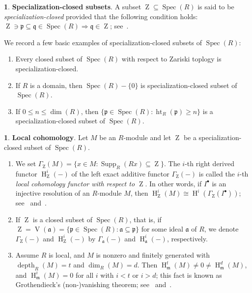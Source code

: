 \documentclass[11pt]{amsart}
\theoremstyle{definition}
\theoremstyle{definition}
\newtheorem{chunk}[thm]{\hspace*{-1.065ex}\bf}
\numberwithin{equation}{section}
\newcommand{\fm}{\mathfrak{m}}
\newcommand{\fp}{\mathfrak{p}}
\newcommand{\fq}{\mathfrak{q}}
\newcommand{\fa}{\mathfrak{a}}
\DeclareMathOperator{\V}{V}
\DeclareMathOperator{\mz}{Z}
\DeclareMathOperator{\depth}{depth}
\DeclareMathOperator{\Ht}{ht}
\DeclareMathOperator{\hh}{H}
\DeclareMathOperator{\Supp}{Supp}
\DeclareMathOperator{\Spec}{Spec}
\begin{document}
\begin{chunk} \textbf{Specialization-closed subsets}.  \label{lsc} A subset $\mz\subseteq\Spec(R)$ is said to be \emph{specialization-closed} provided that the following condition holds: $\mz \owns \fp \subseteq \fq \in \Spec(R) \Longrightarrow \fq\in \mz$; see~\cite{sga2}.

We record a few basic examples of specialization-closed subsets of $\Spec(R)$:

\begin{enumerate}[\rm(i)]
\item Every closed subset of $\Spec(R)$ with respect to Zariski toplogy is specialization-closed.
\item If $R$ is a domain, then $\Spec(R)-\{0\}$ is specialization-closed subset of $\Spec(R)$.
\item If $0\leq n\leq\dim(R)$, then $\{\fp\in\Spec(R): \Ht_R(\fp)\geq n\}$ is a specialization-closed subset of $\Spec(R)$. 
\end{enumerate}
\end{chunk}

\begin{chunk}\label{LCo}\textbf{Local cohomology}. Let $M$ be an $R$-module and let $\mz$ be a specialization-closed subset of $\Spec(R)$. 
\begin{enumerate}[\rm(i)]
\item We set $\Gamma_{\mz}(M)=\{x\in M : \Supp_R(Rx)\subseteq\mz\}$. The $i$-th right derived functor $\hh^i_{\mz}(-)$ of the left exact additive functor $\Gamma_{\mz}(-)$ is called the $i$-th \emph{local cohomology functor with respect to $\mz$}. In other words, if $I^{\bullet}$ is an injective resolution of an $R$-module $M$, then $\hh^i_{\mz}(M) \cong \hh^i(\Gamma_{\mz}(I^{\bullet}))$; see~\cite[3.5.2]{BH} and~\cite{sga2}.

\item If $\mz$ is a closed subset of $\Spec(R)$, that is, if $\mz=\V(\fa)=\{\fp \in \Spec(R): \fa \subseteq \fp\}$ for some ideal $\fa$ of $R$, we denote $\Gamma_{\mz}(-)$ and $\hh^i_{\mz}(-)$ by $\Gamma_{\fa}(-)$ and $\hh^i_{\fa}(-)$, respectively.

\item Assume $R$ is local, and $M$ is nonzero and finitely generated with $\depth_R(M)=t$ and $\dim_R(M)=d$. Then 
$\hh^t_{\fm}(M)\neq 0 \neq \hh^d_{\fm}(M)$, and $\hh^i_{\fm}(M)=0$ for all $i$ with $i<t$ or $i>d$; this fact is known as Grothendieck's (non-)vanishing theorem; see~\cite[6.1.4 and 6.2.8]{Bsh} and~\cite[3.5.7]{BH}.
\end{enumerate}
\end{chunk}
\end{document}
